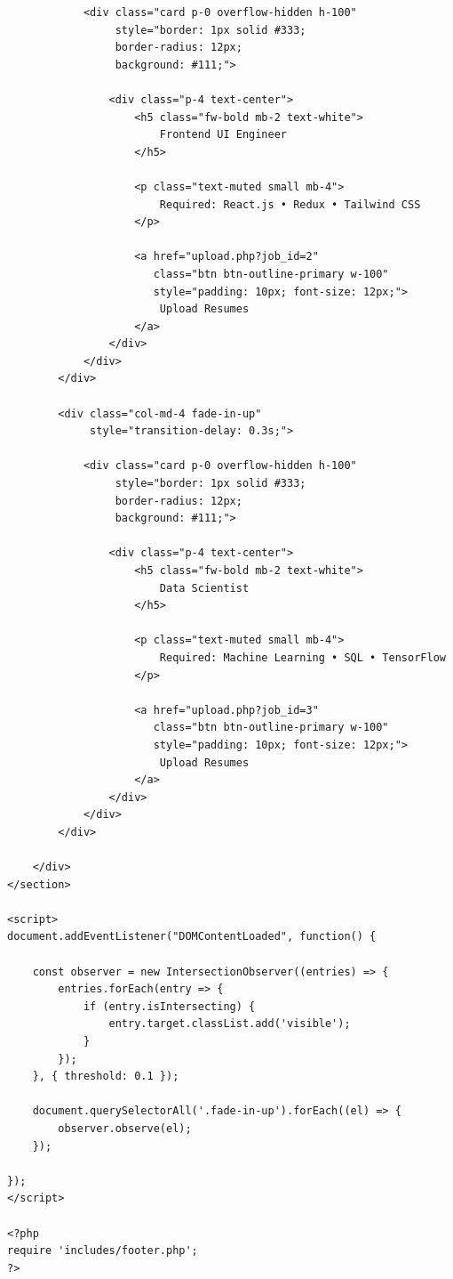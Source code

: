 \documentclass[12pt,a4paper]{report}
\begin{document}
\begin{verbatim}
            <div class="card p-0 overflow-hidden h-100"
                 style="border: 1px solid #333;
                 border-radius: 12px;
                 background: #111;">

                <div class="p-4 text-center">
                    <h5 class="fw-bold mb-2 text-white">
                        Frontend UI Engineer
                    </h5>

                    <p class="text-muted small mb-4">
                        Required: React.js • Redux • Tailwind CSS
                    </p>

                    <a href="upload.php?job_id=2"
                       class="btn btn-outline-primary w-100"
                       style="padding: 10px; font-size: 12px;">
                        Upload Resumes
                    </a>
                </div>
            </div>
        </div>

        <div class="col-md-4 fade-in-up"
             style="transition-delay: 0.3s;">

            <div class="card p-0 overflow-hidden h-100"
                 style="border: 1px solid #333;
                 border-radius: 12px;
                 background: #111;">

                <div class="p-4 text-center">
                    <h5 class="fw-bold mb-2 text-white">
                        Data Scientist
                    </h5>

                    <p class="text-muted small mb-4">
                        Required: Machine Learning • SQL • TensorFlow
                    </p>

                    <a href="upload.php?job_id=3"
                       class="btn btn-outline-primary w-100"
                       style="padding: 10px; font-size: 12px;">
                        Upload Resumes
                    </a>
                </div>
            </div>
        </div>

    </div>
</section>

<script>
document.addEventListener("DOMContentLoaded", function() {

    const observer = new IntersectionObserver((entries) => {
        entries.forEach(entry => {
            if (entry.isIntersecting) {
                entry.target.classList.add('visible');
            }
        });
    }, { threshold: 0.1 });

    document.querySelectorAll('.fade-in-up').forEach((el) => {
        observer.observe(el);
    });

});
</script>

<?php
require 'includes/footer.php';
?>
\end{verbatim}
\normalsize
\end{document}
